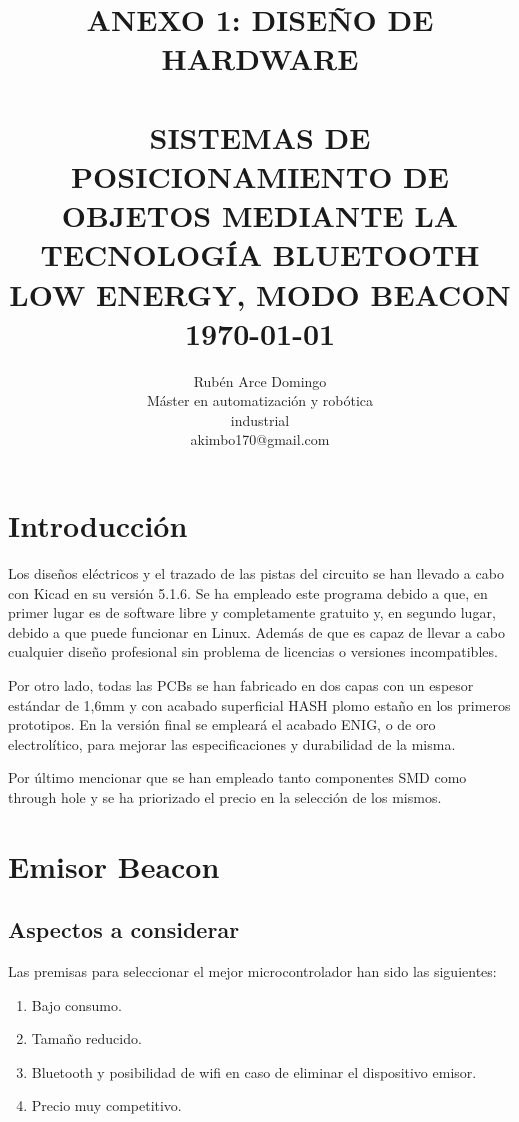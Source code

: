 \documentclass[paper=a4, fontsize=11pt,twoside]{scrartcl}	%
\title{	\normalsize \textsc{ANEXO 1: DISEÑO DE HARDWARE} 	%
		 	\\[2.0cm]								%
			\HRule{0.5pt} \\						%
			\LARGE \textbf{\uppercase{Sistemas de posicionamiento de objetos mediante la tecnología Bluetooth Low Energy, modo Beacon}}	%
			\HRule{2pt} \\ [0.5cm]		%
			\normalsize \today			%
		}
\author{
		Rubén Arce Domingo\\	
		Máster en automatización y robótica\\	
        industrial\\
        akimbo170@gmail.com \\
}
\makeatletter
\def\printtitle{%
    {\centering \@title\par}}
\def\printauthor{%
    {\centering \large \@author}}
\makeatother
\begin{document}
\thispagestyle{empty}		%
\printtitle					%
  	\vfill
\printauthor				%
\newpage


\cleardoublepage
\tableofcontents
\listoffigures
\cleardoublepage
\pagestyle{fancy}

\section{Introducción}
    Los diseños eléctricos y el trazado de las pistas del circuito se han llevado a cabo con Kicad en 
    su versión 5.1.6. Se ha empleado este programa debido a que, en primer lugar es de software libre y
    completamente gratuito y, en segundo lugar, debido a que puede funcionar en Linux. Además de que es capaz de llevar a cabo 
    cualquier diseño profesional sin problema de licencias o versiones incompatibles.

    Por otro lado, todas las PCBs se han fabricado en dos capas con un espesor estándar de 1,6mm y con acabado superficial
    HASH plomo estaño en los primeros prototipos. En la versión final se empleará el acabado ENIG, o de oro 
    electrolítico, para mejorar las especificaciones y durabilidad de la misma.

    Por último mencionar que se han empleado tanto componentes SMD como through hole y se ha priorizado el precio en la selección de los mismos.
\section{Emisor Beacon}
    \subsection{Aspectos a considerar}
        Las premisas para seleccionar el mejor microcontrolador han sido las siguientes: 
        \begin{enumerate}
            \item Bajo consumo.
            \item Tamaño reducido.
            \item Bluetooth y posibilidad de wifi en caso de eliminar el dispositivo emisor.
            \item Precio muy competitivo.
        \end{enumerate}
\end{document}

